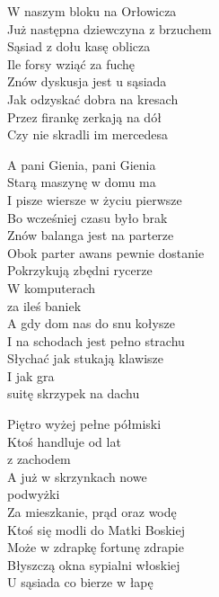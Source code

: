 \begin{text}
    W naszym bloku na Orłowicza\\
    Już następna dziewczyna z brzuchem\\
    Sąsiad z dołu kasę oblicza\\
    Ile forsy wziąć za fuchę\\
    Znów dyskusja jest u sąsiada\\
    Jak odzyskać dobra na kresach\\
    Przez firankę zerkają na dół\\
    Czy nie skradli im mercedesa

    \vin A pani Gienia, pani Gienia\\
    \vin Starą maszynę w domu ma\\
    \vin I pisze wiersze w życiu pierwsze\\
    \vin Bo wcześniej czasu było brak\\

    Znów balanga jest na parterze\\
    Obok parter awans pewnie dostanie\\
    Pokrzykują zbędni rycerze\\
    W komputerach\\
    za ileś baniek\\
    A gdy dom nas do snu kołysze\\
    I na schodach jest pełno strachu\\
    Słychać jak stukają klawisze\\
    I jak gra\\
    suitę skrzypek na dachu

    Piętro wyżej pełne półmiski\\
    Ktoś handluje od lat\\
    z zachodem\\
    A już w skrzynkach nowe\\
    podwyżki\\
    Za mieszkanie, prąd oraz wodę\\
    Ktoś się modli do Matki Boskiej\\
    Może w zdrapkę fortunę zdrapie\\
    Błyszczą okna sypialni włoskiej\\
    U sąsiada co bierze w łapę
\end{text}
\begin{chord}

\end{chord}